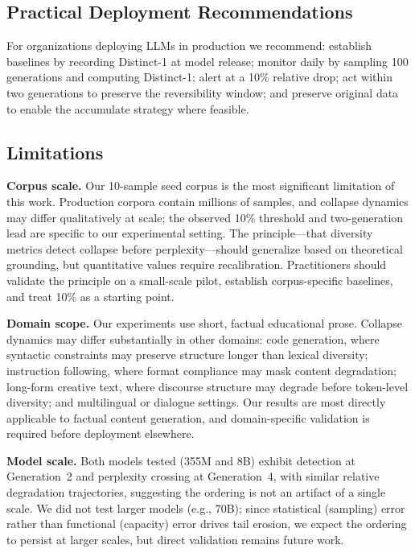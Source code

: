 \documentclass{svproc}
\newcommand{\dist}[1]{Distinct-#1}
\begin{document}
\subsection{Practical Deployment Recommendations}
For organizations deploying LLMs in production we recommend: establish baselines by
recording \dist{1} at model release; monitor daily by sampling 100 generations and
computing \dist{1}; alert at a 10\% relative drop; act within two generations to
preserve the reversibility window; and preserve original data to enable the
accumulate strategy where feasible.

\subsection{Limitations}\label{sec:limitations}
\noindent\textbf{Corpus scale.} Our 10-sample seed corpus is the most significant
limitation of this work. Production corpora contain millions of samples, and
collapse dynamics may differ qualitatively at scale; the observed 10\% threshold and
two-generation lead are specific to our experimental setting. The principle---that
diversity metrics detect collapse before perplexity---should generalize based on
theoretical grounding, but quantitative values require recalibration. Practitioners
should validate the principle on a small-scale pilot, establish corpus-specific
baselines, and treat 10\% as a starting point.

\noindent\textbf{Domain scope.} Our experiments use short, factual educational
prose. Collapse dynamics may differ substantially in other domains: code
generation, where syntactic constraints may preserve structure longer than lexical
diversity; instruction following, where format compliance may mask content
degradation; long-form creative text, where discourse structure may degrade before
token-level diversity; and multilingual or dialogue settings. Our results are most
directly applicable to factual content generation, and domain-specific validation
is required before deployment elsewhere.

\noindent\textbf{Model scale.} Both models tested (355M and 8B) exhibit detection
at Generation~2 and perplexity crossing at Generation~4, with similar relative
degradation trajectories, suggesting the ordering is not an artifact of a single
scale. We did not test larger models (e.g., 70B); since statistical (sampling)
error rather than functional (capacity) error drives tail erosion, we expect the
ordering to persist at larger scales, but direct validation remains future work.
\end{document}
